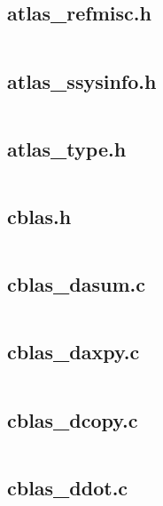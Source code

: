 \documentclass{article}
\begin{document}
\subsection{atlas\_refmisc.h}
\inputminted{c}{/home/dufferzafar/dev/@clones/scikit-learn/sklearn/src/cblas/atlas_refmisc.h}
\newpage

\subsection{atlas\_ssysinfo.h}
\inputminted{c}{/home/dufferzafar/dev/@clones/scikit-learn/sklearn/src/cblas/atlas_ssysinfo.h}
\newpage

\subsection{atlas\_type.h}
\inputminted{c}{/home/dufferzafar/dev/@clones/scikit-learn/sklearn/src/cblas/atlas_type.h}
\newpage

\subsection{cblas.h}
\inputminted{c}{/home/dufferzafar/dev/@clones/scikit-learn/sklearn/src/cblas/cblas.h}
\newpage

\subsection{cblas\_dasum.c}
\inputminted{c}{/home/dufferzafar/dev/@clones/scikit-learn/sklearn/src/cblas/cblas_dasum.c}
\newpage

\subsection{cblas\_daxpy.c}
\inputminted{c}{/home/dufferzafar/dev/@clones/scikit-learn/sklearn/src/cblas/cblas_daxpy.c}
\newpage

\subsection{cblas\_dcopy.c}
\inputminted{c}{/home/dufferzafar/dev/@clones/scikit-learn/sklearn/src/cblas/cblas_dcopy.c}
\newpage

\subsection{cblas\_ddot.c}
\inputminted{c}{/home/dufferzafar/dev/@clones/scikit-learn/sklearn/src/cblas/cblas_ddot.c}
\newpage
\end{document}
